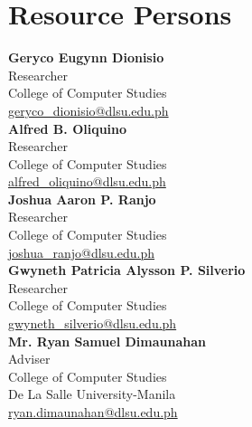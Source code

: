 %
%
%                 

\chapter{Resource Persons}
\label{sec:appendixc}

%
%
%
%

%
%
\newcommand{\resperson}[4]{\textbf{#1} \\ #2 \\ #3 \\ \url{#4}\vspace{0.5em}\\}

\resperson{Geryco Eugynn Dionisio}{Researcher}{College of Computer Studies}{geryco_dionisio@dlsu.edu.ph}
\resperson{Alfred B. Oliquino}{Researcher}{College of Computer Studies}{alfred_oliquino@dlsu.edu.ph}
\resperson{Joshua Aaron P. Ranjo}{Researcher}{College of Computer Studies}{joshua_ranjo@dlsu.edu.ph}
\resperson{Gwyneth Patricia Alysson P. Silverio}{Researcher}{College of Computer Studies}{gwyneth_silverio@dlsu.edu.ph}
\resperson{Mr. Ryan Samuel Dimaunahan}{Adviser}{College of Computer Studies\\De La Salle University-Manila}{ryan.dimaunahan@dlsu.edu.ph}
